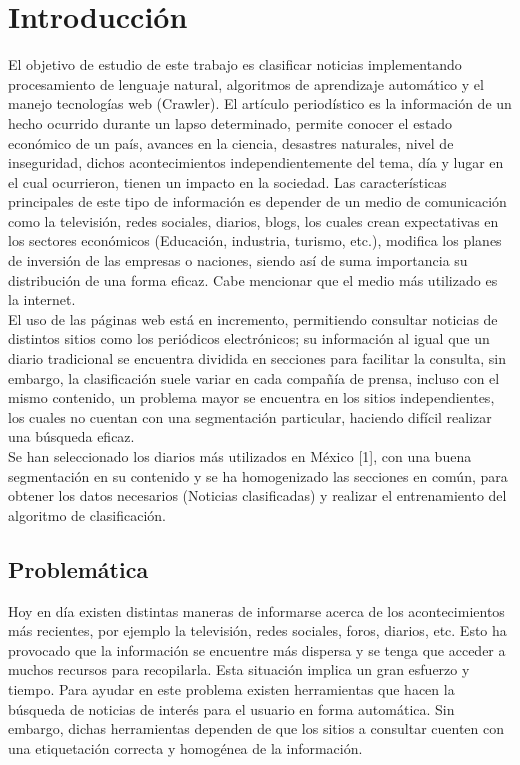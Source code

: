 
\chapter{Introducción}\label{chp:introduccion}

El objetivo de estudio de este trabajo es clasificar noticias implementando procesamiento de lenguaje natural, algoritmos de aprendizaje automático y el manejo tecnologías web (Crawler). El artículo periodístico es la información de un hecho ocurrido durante un lapso determinado, permite conocer el estado económico de un país, avances en la ciencia, desastres naturales, nivel de inseguridad, dichos acontecimientos independientemente del tema, día y lugar en el cual ocurrieron, tienen un impacto en la sociedad. Las características principales de este tipo de información es depender de un medio de comunicación como la televisión, redes sociales, diarios, blogs, los cuales crean expectativas en los sectores económicos (Educación, industria, turismo, etc.), modifica los planes de inversión de las empresas o naciones, siendo así de suma importancia su distribución de una forma eficaz. Cabe mencionar que el medio más utilizado es la internet.\\

El uso de las páginas web está en incremento, permitiendo consultar noticias de distintos sitios como los periódicos electrónicos; su información al igual que un diario tradicional se encuentra dividida en secciones para facilitar la consulta, sin embargo, la clasificación suele variar en cada compañía de prensa, incluso con el mismo contenido, un problema mayor se encuentra en los sitios independientes, los cuales no cuentan con una segmentación particular, haciendo difícil realizar una búsqueda eficaz.\\

Se han seleccionado los diarios más utilizados en México [1], con una buena segmentación en su contenido y se ha homogenizado las secciones en común, para obtener los datos necesarios (Noticias clasificadas) y realizar el entrenamiento del algoritmo de clasificación.


\section{Problemática}

Hoy en día existen distintas maneras de informarse acerca de los acontecimientos más recientes, por ejemplo la televisión, redes sociales, foros, diarios, etc. Esto ha provocado que la información se encuentre más dispersa y se tenga que acceder a muchos recursos para recopilarla. Esta situación implica un gran esfuerzo y tiempo. Para ayudar en este problema existen herramientas que hacen la búsqueda de noticias de interés para el usuario en forma automática. Sin embargo, dichas herramientas dependen de que los sitios a consultar cuenten con una etiquetación correcta y homogénea de la información.\\


